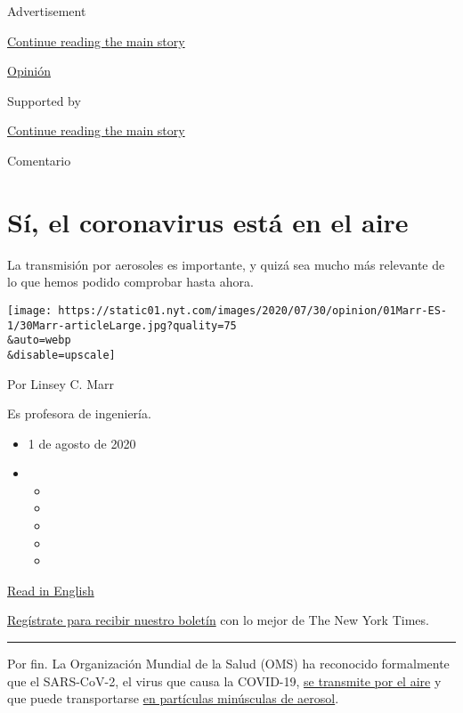 Advertisement

\protect\hyperlink{after-top}{Continue reading the main story}

\href{/es/section/opinion}{Opinión}

Supported by

\protect\hyperlink{after-sponsor}{Continue reading the main story}

Comentario

\hypertarget{suxed-el-coronavirus-estuxe1-en-el-aire}{%
\section{Sí, el coronavirus está en el
aire}\label{suxed-el-coronavirus-estuxe1-en-el-aire}}

La transmisión por aerosoles es importante, y quizá sea mucho más
relevante de lo que hemos podido comprobar hasta ahora.

\texttt{[image: https://static01.nyt.com/images/2020/07/30/opinion/01Marr-ES-1/30Marr-articleLarge.jpg?quality=75\\\&auto=webp\\\&disable=upscale]}

Por Linsey C. Marr

Es profesora de ingeniería.

\begin{itemize}
\item
  1 de agosto de 2020
\item
  \begin{itemize}
  \item
  \item
  \item
  \item
  \item
  \end{itemize}
\end{itemize}

\href{https://www.nytimes.com/2020/07/30/opinion/coronavirus-aerosols.html}{Read
in English}

\href{https://www.nytimes.com/newsletters/el-times}{Regístrate para
recibir nuestro boletín} con lo mejor de The New York Times.

\begin{center}\rule{0.5\linewidth}{\linethickness}\end{center}

Por fin. La Organización Mundial de la Salud (OMS) ha reconocido
formalmente que el SARS-CoV-2, el virus que causa la COVID-19,
\href{https://www.nytimes.com/2020/07/09/health/virus-aerosols-who.html}{se
transmite por el aire} y que puede transportarse
\href{https://www.nature.com/articles/d41586-020-02058-1}{en partículas
minúsculas de aerosol}.

